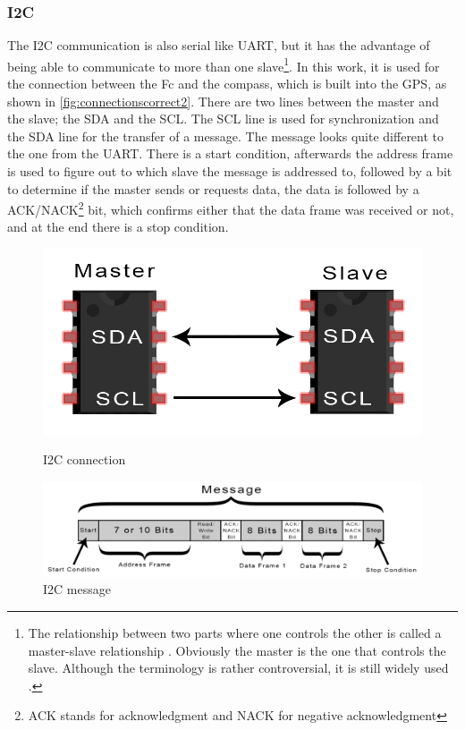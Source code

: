 \documentclass[svgnames]{article}
\begin{document}
	\subsubsection{I2C}
	The \gls{I2C} communication is also serial like \gls{UART}, but it has the advantage of being able to communicate to more than one slave\footnote{The relationship between two parts where one controls the other is called a master-slave relationship \cite{i2cprotocol}. Obviously the master is the one that controls the slave. Although the terminology is rather controversial, it is still widely used \cite{masterslave}.}. In this work, it is used for the connection between the \gls{Fc} and the compass, which is built into the \gls{GPS}, as shown in \cref{fig:connectionscorrect2}. There are two lines between the master and the slave; the \gls{SDA} and the \gls{SCL}. The \gls{SCL} line is used for synchronization and the \gls{SDA} line for the transfer of a message. The message looks quite different to the one from the \gls{UART}. There is a start condition, afterwards the address frame is used to figure out to which slave the message is addressed to, followed by a bit to determine if the master sends or requests data, the data is followed by a ACK/NACK\footnote{ACK stands for acknowledgment and NACK for negative acknowledgment} bit, which confirms either that the data frame was received or not, and at the end there is a stop condition.
\begin{figure}[ht]
	\begin{minipage}[c]{0.4\textwidth}
		\includegraphics[width=\textwidth]{pictures/I2Cconnection}
		\caption{\gls{I2C} connection \cite{i2cprotocol}}
		\label{fig:I2Cconnection}
	\end{minipage}
	\hfill
	\begin{minipage}[c]{0.4\textwidth}
		\includegraphics[width=\textwidth]{pictures/I2Cpackage}
		\caption{\gls{I2C} message \cite{i2cprotocol}}
		\label{fig:I2Cpackage}
	\end{minipage}
\end{figure}
\end{document}
